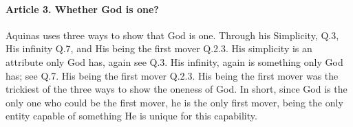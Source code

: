 \documentclass{ucetd}
\begin{document}
\paragraph{Article 3. Whether God is one?}
Aquinas uses three ways to show that God is one. Through his Simplicity, Q.3, His infinity Q.7, and His being the first mover Q.2.3. His simplicity is an attribute only God has, again see Q.3. His infinity, again is something only God has; see Q.7. His being the first mover Q.2.3. His being the first mover was the trickiest of the three ways to show the oneness of God. In short, since God is the only one who could be the first mover, he is the only first mover, being the only entity capable of something He is unique for this capability.
\end{document}
